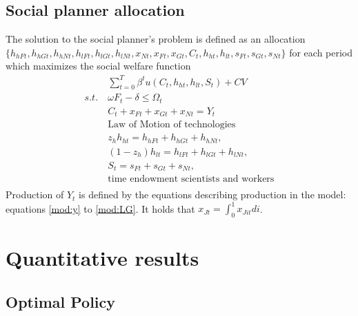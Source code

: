 %

\subsection{Social planner allocation}\label{app:sp_prob} The solution to the social planner's problem is defined as an allocation \\ $\{h_{hFt}, h_{hGt}, h_{hNt}, h_{lFt}, h_{lGt}, h_{lNt}, x_{Nt}, x_{Ft}, x_{Gt}, C_t,  h_{ht}, h_{lt}, s_{Ft}, s_{Gt}, s_{Nt} \}$ for each period which maximizes the social welfare function 
\begin{align*} &\sum_{t=0}^{T}\beta^t u(C_{t}, h_{ht}, h_{lt}, S_{t})+ CV\\
s.t.\ &  \omega F_{t} -\delta \leq \Omega_t\\
&C_t+x_{Ft}+x_{Gt}+x_{Nt}=Y_t\\
&\text{Law of Motion of technologies}\\
&z_h h_{ht}=h_{hFt}+h_{hGt}+h_{hNt},\\
&(1-z_h) h_{lt}=h_{lFt}+h_{lGt}+h_{lNt},\\
&S_{t}=s_{Ft}+s_{Gt}+s_{Nt},\\
&\text{time endowment scientists and workers}\\
\end{align*}
Production of $Y_t$ is defined by the equations describing production in the model: equations \ref{mod:y} to \ref{mod:LG}. It holds that $x_{Jt}=\int_{0}^{1}x_{Jit}di$.
\section{Quantitative results}\label{app:quant_res}



\subsection{Optimal Policy}\label{app:quant_res_opt}

